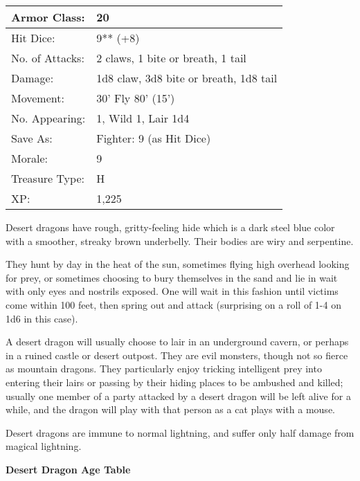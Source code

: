 \documentclass[a4paper,twoside,openany,10pt]{book}
\begin{document}
\begin{multicols}{2}
\begin{tabularx}{0.48\textwidth}{@{}lX@{}}
Armor Class: & 20 \\\hline
Hit Dice: & 9** (+8) \\\hline
No. of Attacks: & 2 claws, 1 bite or breath, 1 tail \\\hline
Damage: & 1d8 claw, 3d8 bite or breath, 1d8 tail \\\hline
Movement: & 30' Fly 80'
(15') \\\hline
No. Appearing: & 1, Wild 1, Lair 1d4 \\\hline
Save As: & Fighter: 9 (as Hit Dice) \\\hline
Morale: & 9 \\\hline
Treasure Type: & H \\\hline
XP: & 1,225 \\\hline
\end{tabularx}\medskip

Desert dragons have rough, gritty-feeling hide which is a dark steel blue color with a smoother, streaky brown underbelly. Their bodies are wiry and serpentine.

They hunt by day in the heat of the sun, sometimes flying high overhead looking for prey, or sometimes choosing to bury themselves in the sand and lie in wait with only eyes and nostrils exposed. One will wait in this fashion until victims come within 100 feet, then spring out and attack (surprising on a roll of 1-4 on 1d6 in this case).

A desert dragon will usually choose to lair in an underground cavern, or perhaps in a ruined castle or desert outpost. They are evil monsters, though not so fierce as mountain dragons. They particularly enjoy tricking intelligent prey into entering their lairs or passing by their hiding places to be ambushed and killed; usually one member of a party attacked by a desert dragon will be left alive for a while, and the dragon will play with that person as a cat plays with a mouse.

Desert dragons are immune to normal lightning, and suffer only half damage from magical lightning.


\begin{center}
	\textbf{Desert Dragon Age Table}\\
	

\end{center}
\end{multicols}
\end{document}

